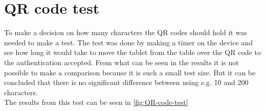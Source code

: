 \section{QR code test}
To make a decision on how many characters the QR codes should hold it was needed to make a test. The test was done by making a timer on the device and see how long it would take to move the tablet from the table over the QR code to the authentication accepted. 
From what can be seen in the results it is not possible to make a comparison because it is such a small test size. But it can be concluded that there is no significant difference between using e.g. 10 and 200 characters. \\
The results from this test can be seen in \autoref{fig:QR-code-test}


